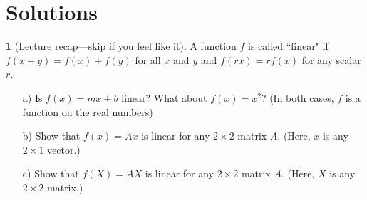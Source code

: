 \documentclass{article}
\theoremstyle{definition}
\newtheorem{prob}{}
\begin{document}
\section*{Solutions}
\begin{prob}[Lecture recap---skip if you feel like it] A function $f$ is called ``linear" if $f(x+y)=f(x) + f(y)$ for all $x$ and $y$ and $f(rx)=r f(x)$ for any scalar $r$.
	\begin{itemize}
		\item [a)] Is $f(x)=m x +b$ linear? What about $f(x)=x^2$? (In both cases, $f$ is a function on the real numbers)
		\item [b)] Show that $f(x)=Ax$ is linear for any $2 \times 2$ matrix $A$. (Here, $x$ is any $2 \times 1$ vector.)
		\item [c)] Show that $f(X)=AX$ is linear for any $2 \times 2$ matrix $A$. (Here, $X$ is any $2 \times 2$ matrix.)
	\end{itemize}
\end{prob}
\end{document}
